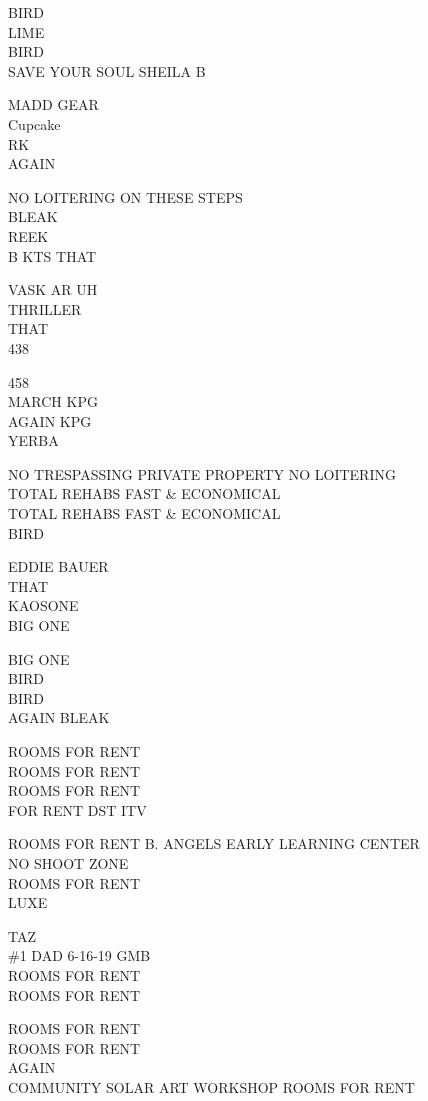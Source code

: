 \documentclass[10pt,letterpaper]{article}
\begin{document}
BIRD\\
LIME\\
BIRD\\
SAVE YOUR SOUL SHEILA B

MADD GEAR\\
Cupcake\\
RK\\
AGAIN

NO LOITERING ON THESE STEPS\\
BLEAK\\
REEK\\
B KTS THAT

VASK AR UH\\
THRILLER\\
THAT\\
438

458\\
MARCH KPG\\
AGAIN KPG\\
YERBA

NO TRESPASSING PRIVATE PROPERTY NO LOITERING\\
TOTAL REHABS FAST \& ECONOMICAL\\
TOTAL REHABS FAST \& ECONOMICAL\\
BIRD

EDDIE BAUER\\
THAT\\
KAOSONE\\
BIG ONE

BIG ONE\\
BIRD\\
BIRD\\
AGAIN BLEAK

ROOMS FOR RENT\\
ROOMS FOR RENT\\
ROOMS FOR RENT\\
FOR RENT DST ITV

ROOMS FOR RENT B. ANGELS EARLY LEARNING CENTER\\
NO SHOOT ZONE\\
ROOMS FOR RENT\\
LUXE

TAZ\\
\#1 DAD 6{-}16{-}19 GMB\\
ROOMS FOR RENT\\
ROOMS FOR RENT

ROOMS FOR RENT\\
ROOMS FOR RENT\\
AGAIN\\
COMMUNITY SOLAR ART WORKSHOP ROOMS FOR RENT
\end{document}
